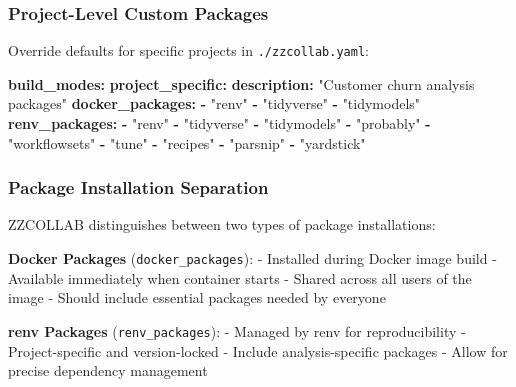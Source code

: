 \documentclass[
]{article}
\newenvironment{Shaded}{\begin{snugshade}}{\end{snugshade}}
\newcommand{\AttributeTok}[1]{\textcolor[rgb]{0.13,0.29,0.53}{#1}}
\newcommand{\FunctionTok}[1]{\textcolor[rgb]{0.13,0.29,0.53}{\textbf{#1}}}
\newcommand{\KeywordTok}[1]{\textcolor[rgb]{0.13,0.29,0.53}{\textbf{#1}}}
\newcommand{\StringTok}[1]{\textcolor[rgb]{0.31,0.60,0.02}{#1}}
\begin{document}
\subsubsection{Project-Level Custom
Packages}\label{project-level-custom-packages}

Override defaults for specific projects in \texttt{./zzcollab.yaml}:

\begin{Shaded}
\begin{Highlighting}[]
\FunctionTok{build\_modes}\KeywordTok{:}
\AttributeTok{  }\FunctionTok{project\_specific}\KeywordTok{:}
\AttributeTok{    }\FunctionTok{description}\KeywordTok{:}\AttributeTok{ }\StringTok{"Customer churn analysis packages"}
\AttributeTok{    }\FunctionTok{docker\_packages}\KeywordTok{:}
\AttributeTok{      }\KeywordTok{{-}}\AttributeTok{ }\StringTok{"renv"}
\AttributeTok{      }\KeywordTok{{-}}\AttributeTok{ }\StringTok{"tidyverse"}
\AttributeTok{      }\KeywordTok{{-}}\AttributeTok{ }\StringTok{"tidymodels"}
\AttributeTok{    }\FunctionTok{renv\_packages}\KeywordTok{:}
\AttributeTok{      }\KeywordTok{{-}}\AttributeTok{ }\StringTok{"renv"}
\AttributeTok{      }\KeywordTok{{-}}\AttributeTok{ }\StringTok{"tidyverse"}
\AttributeTok{      }\KeywordTok{{-}}\AttributeTok{ }\StringTok{"tidymodels"}
\AttributeTok{      }\KeywordTok{{-}}\AttributeTok{ }\StringTok{"probably"}
\AttributeTok{      }\KeywordTok{{-}}\AttributeTok{ }\StringTok{"workflowsets"}
\AttributeTok{      }\KeywordTok{{-}}\AttributeTok{ }\StringTok{"tune"}
\AttributeTok{      }\KeywordTok{{-}}\AttributeTok{ }\StringTok{"recipes"}
\AttributeTok{      }\KeywordTok{{-}}\AttributeTok{ }\StringTok{"parsnip"}
\AttributeTok{      }\KeywordTok{{-}}\AttributeTok{ }\StringTok{"yardstick"}
\end{Highlighting}
\end{Shaded}

\subsubsection{Package Installation
Separation}\label{package-installation-separation}

ZZCOLLAB distinguishes between two types of package installations:

\textbf{Docker Packages} (\texttt{docker\_packages}): - Installed during
Docker image build - Available immediately when container starts -
Shared across all users of the image - Should include essential packages
needed by everyone

\textbf{renv Packages} (\texttt{renv\_packages}): - Managed by renv for
reproducibility - Project-specific and version-locked - Include
analysis-specific packages - Allow for precise dependency management
\end{document}
